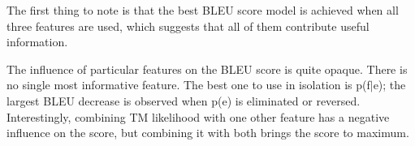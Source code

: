 The first thing to note is that the best BLEU score model is achieved when all three features are used, which suggests that all of them contribute useful information.

The influence of particular features on the BLEU score is quite opaque. There is no single most informative feature. The best one to use in isolation is p(f$|$e); the largest BLEU decrease is observed when p(e) is eliminated or reversed. Interestingly, combining TM likelihood with one other feature has a negative influence on the score, but combining it with both brings the score to maximum.  

